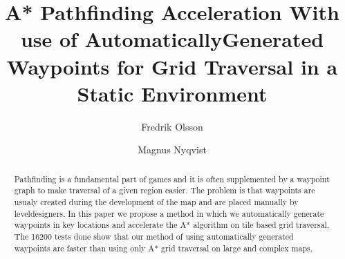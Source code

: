 \documentclass[sigconf]{acmart}
\begin{document}
\title{A* Pathfinding Acceleration With use of Automatically\newline Generated Waypoints for Grid Traversal in a Static Environment}

\author{Fredrik Olsson}

\author{Magnus Nyqvist}

\renewcommand{\shortauthors}{Fredrik and Magnus}

\begin{abstract}
Pathfinding is a fundamental part of games and it is often supplemented by a waypoint graph to make traversal of a given region easier. The problem is that waypoints are usualy created during the development of the map
and are placed manually by leveldesigners. In this paper we propose a method in which we automatically generate waypoints in key locations and accelerate the A* algorithm on tile based grid traversal.
The 16200 tests done show that our method of using automatically generated waypoints are faster than using only A* grid traversal on large and complex maps.
\end{abstract}

\end{document}
